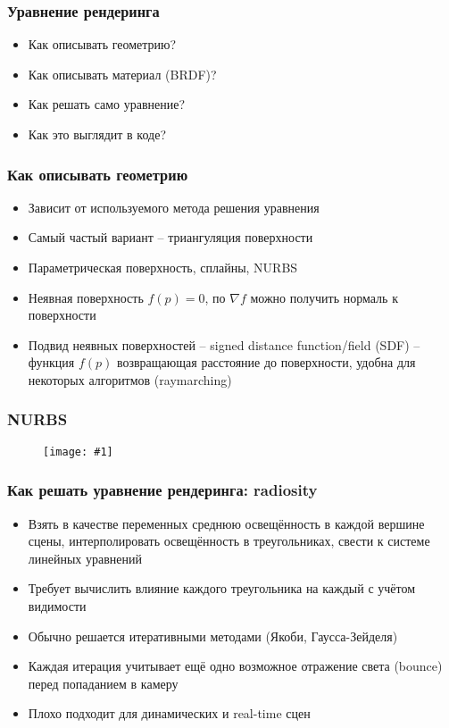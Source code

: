 \documentclass{beamer}
\newcommand{\slideimage}[1]{
  \begin{figure}
    \begin{adjustbox}{width=\textwidth, totalheight=\textheight-2\baselineskip-2\baselineskip,keepaspectratio}
      \texttt{[image: \#1]}
    \end{adjustbox}
  \end{figure}
}
\begin{document}
\begin{frame}[fragile]
\frametitle{Уравнение рендеринга}
\begin{itemize}
\item Как описывать геометрию?
\pause
\item Как описывать материал (BRDF)?
\pause
\item Как решать само уравнение?
\pause
\item Как это выглядит в коде?
\end{itemize}
\end{frame}

\begin{frame}[fragile]
\frametitle{Как описывать геометрию}
\begin{itemize}
\item Зависит от используемого метода решения уравнения
\pause
\item Самый частый вариант -- триангуляция поверхности
\pause
\item Параметрическая поверхность, сплайны, NURBS
\pause
\item Неявная поверхность \begin{math}f(p) = 0\end{math}, по \begin{math}\nabla f\end{math} можно получить нормаль к поверхности
\pause
\item Подвид неявных поверхностей -- signed distance function/field (SDF) -- функция \begin{math}f(p)\end{math} возвращающая расстояние до поверхности, удобна для некоторых алгоритмов (raymarching)
\end{itemize}
\end{frame}

\begin{frame}[fragile]
\frametitle{NURBS}
\slideimage{nurbs.png}
\end{frame}

\begin{frame}[fragile]
\frametitle{Как решать уравнение рендеринга: radiosity}
\begin{itemize}
\item Взять в качестве переменных среднюю освещённость в каждой вершине сцены, интерполировать освещённость в треугольниках, свести к системе линейных уравнений
\pause
\item Требует вычислить влияние каждого треугольника на каждый с учётом видимости
\pause
\item Обычно решается итеративными методами (Якоби, Гаусса-Зейделя)
\item Каждая итерация учитывает ещё одно возможное отражение света (bounce) перед попаданием в камеру
\pause
\item Плохо подходит для динамических и real-time сцен
\end{itemize}
\end{frame}
\end{document}
